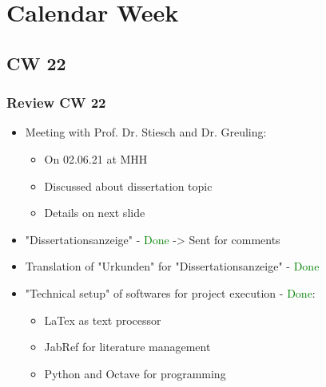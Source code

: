 \section{Calendar Week}
\subsection{CW 22}
\begin{frame}
  \frametitle{Review CW 22}
	\begin{itemize}
	\item Meeting with Prof. Dr. Stiesch and Dr. Greuling:
	\begin{itemize}
		\item On 02.06.21 at MHH
		\item Discussed about dissertation topic
		\item Details on next slide
	\end{itemize}
	\item "Dissertationsanzeige" - \textcolor{green}{Done} -> Sent for comments
	\item Translation of "Urkunden" for "Dissertationsanzeige" - \textcolor{green}{Done}
	\item "Technical setup" of softwares for project execution - \textcolor{green}{Done}:
	\begin{itemize}
		\item LaTex as text processor
		\item JabRef for literature management
		\item Python and Octave for programming
	\end{itemize}
	\end{itemize}
\end{frame}

